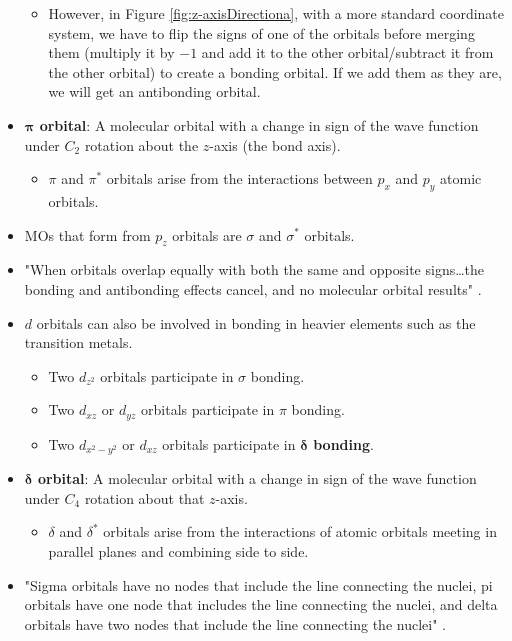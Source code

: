 \documentclass[../notes.tex]{subfiles}
\begin{document}
\begin{itemize}
\begin{itemize}
        \item However, in Figure \ref{fig:z-axisDirectiona}, with a more standard coordinate system, we have to flip the signs of one of the orbitals before merging them (multiply it by $-1$ and add it to the other orbital/subtract it from the other orbital) to create a bonding orbital. If we add them as they are, we will get an antibonding orbital.
    \end{itemize}
    \item \textbf{$\bm{\pi}$ orbital}: A molecular orbital with a change in sign of the wave function under $C_2$ rotation about the $z$-axis (the bond axis).
    \begin{itemize}
        \item $\pi$ and $\pi^*$ orbitals arise from the interactions between $p_x$ and $p_y$ atomic orbitals.
    \end{itemize}
    \item MOs that form from $p_z$ orbitals are $\sigma$ and $\sigma^*$ orbitals.
    \item "When orbitals overlap equally with both the same and opposite signs\dots the bonding and antibonding effects cancel, and no molecular orbital results" \parencite[121]{bib:MiesslerFischerTarr}.
    \item $d$ orbitals can also be involved in bonding in heavier elements such as the transition metals.
    \begin{itemize}
        \item Two $d_{z^2}$ orbitals participate in $\sigma$ bonding.
        \item Two $d_{xz}$ or $d_{yz}$ orbitals participate in $\pi$ bonding.
        \item Two $d_{x^2-y^2}$ or $d_{xz}$ orbitals participate in \textbf{$\bm{\delta}$ bonding}.
    \end{itemize}
    \item \textbf{$\bm{\delta}$ orbital}: A molecular orbital with a change in sign of the wave function under $C_4$ rotation about that $z$-axis.
    \begin{itemize}
        \item $\delta$ and $\delta^*$ orbitals arise from the interactions of atomic orbitals meeting in parallel planes and combining side to side.
    \end{itemize}
    \item "Sigma orbitals have no nodes that include the line connecting the nuclei, pi orbitals have one node that includes the line connecting the nuclei, and delta orbitals have two nodes that include the line connecting the nuclei" \parencite[121]{bib:MiesslerFischerTarr}.

\end{itemize}
\end{document}
